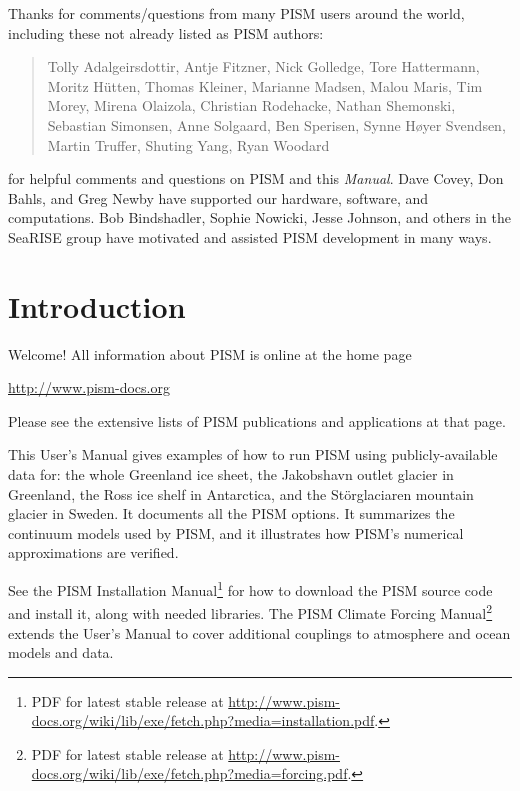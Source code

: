 \documentclass[titlepage,letterpaper,final]{scrartcl}
\begin{document}
Thanks for comments/questions from many PISM users around the world, including these not already listed as PISM authors:

\begin{quote}
Tolly Adalgeirsdottir, Antje Fitzner, Nick Golledge, Tore Hattermann, Moritz H\"utten, Thomas Kleiner, Marianne Madsen, Malou Maris, Tim Morey, Mirena Olaizola, Christian Rodehacke, Nathan Shemonski, Sebastian Simonsen, Anne Solgaard, Ben Sperisen, Synne H\o{}yer Svendsen, Martin Truffer, Shuting Yang, Ryan Woodard
\end{quote}

\noindent for helpful comments and questions on PISM and this \emph{Manual}.  Dave Covey, Don Bahls, and Greg Newby have supported our hardware, software, and computations.  Bob Bindshadler, Sophie Nowicki, Jesse Johnson, and others in the SeaRISE group have motivated and assisted PISM development in many ways.  

\normalsize



\newpage
\setcounter{tocdepth}{3}
\small
\tableofcontents
\normalsize

\newpage


\section{Introduction}\label{sec:intro}

Welcome!  All information about PISM is online at the home page
\begin{center}
  \url{http://www.pism-docs.org}
\end{center}
Please see the extensive lists of PISM publications and applications at that page.

This User's Manual gives examples of how to run PISM using publicly-available data for: the whole Greenland ice sheet, the Jakobshavn outlet glacier in Greenland, the Ross ice shelf in Antarctica, and the St\"orglaciaren mountain glacier in Sweden.  It documents all the PISM options.  It summarizes the continuum models used by PISM, and it illustrates how PISM's numerical approximations are verified.

See the PISM Installation Manual\footnote{PDF for latest stable release at \url{http://www.pism-docs.org/wiki/lib/exe/fetch.php?media=installation.pdf}.}
for how to download the PISM source code and install
it, along with needed libraries.  The PISM Climate Forcing
Manual\footnote{PDF for latest stable release at \url{http://www.pism-docs.org/wiki/lib/exe/fetch.php?media=forcing.pdf}.}
extends the User's Manual to cover additional couplings to atmosphere and ocean
models and data.
\end{document}
